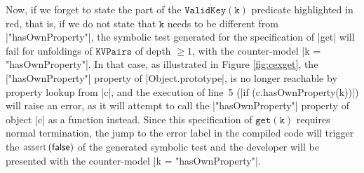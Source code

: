Now, if we forget to state the part of the $\mathtt{ValidKey(k)}$ predicate highlighted in red, that is, if we do not state that $\mathtt{k}$ needs to be different from \jsinline|"hasOwnProperty"|, the symbolic test generated for the specification of \jsinline|get| will fail for unfoldings of $\mathtt{KVPairs}$ of depth $\geq 1$, with the counter-model \jsinline|k = "hasOwnProperty"|. 
In that case, as illustrated in Figure \ref{fig:cexget}, the \jsinline|"hasOwnProperty"| property of \jsinline|Object.prototype|, is no longer reachable by property lookup from \jsinline|c|, and
the execution of line~5 (\jsinline|if (c.hasOwnProperty(k))|) will raise an error, as it will attempt to call the \jsinline|"hasOwnProperty"| property of object \jsinline|c| as a function instead. 
Since this specification of $\mathtt{get(k)}$ requires normal termination, the jump to the error label in the compiled \jsil code will trigger the $\assert(\jfalse)$ of the generated symbolic test and the developer will be presented with the counter-model \jsinline|k = "hasOwnProperty"|.





